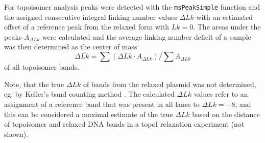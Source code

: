 \documentclass[10pt,a4]{article}
\def\cite#1{\hypersetup{citecolor=Teal}\citep{#1}} %
\begin{document}
For topoisomer analysis peaks were detected with the
\texttt{msPeakSimple} function and the assigned consecutive integral
linking number values $\Delta Lk$ with an estimated offset of a
reference peak from the relaxed form with $Lk=0$. The areas under the
peaks $A_{\Delta Lk}$ were calculated and the average linking number
deficit of a sample was then determined as the center of mass
\begin{equation}
  \label{eq:dlk}
  \Delta \overline{Lk} = \sum{(\Delta Lk \cdot
    A_{\Delta Lk})}/\sum{A_{\Delta Lk}}
\end{equation}
of all topoisomer bands.

Note, that the true $\Delta Lk$ of bands from the relaxed plasmid was
not determined, eg. by Keller's band counting method
\cite{Keller1975b}.  The calculated $\Delta Lk$ values refer to an
assignment of a reference band that was present in all lanes to
$\Delta Lk=-8$, and this can be considered a maximal estimate of the
true $\Delta Lk$ based on the distance of topoisomer and relaxed DNA
bands in a topoI relaxation experiment (not shown).

\setlength{\bibsep}{0.0pt}
\begin{spacing}{0.9}
  
\end{spacing}
\end{document}
